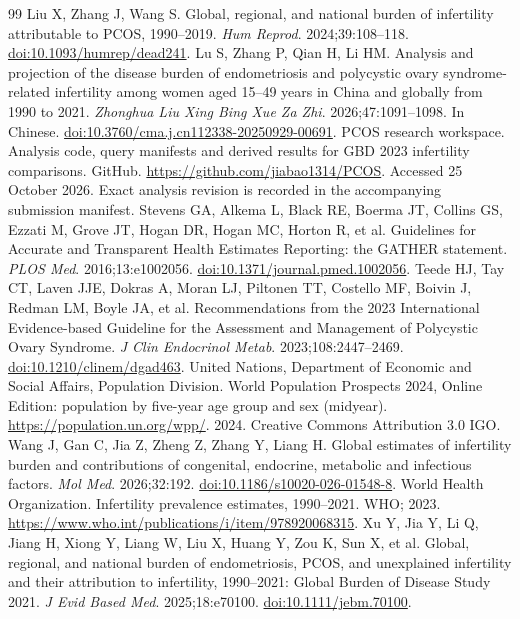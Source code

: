 \documentclass[11pt,a4paper]{article}
\begin{document}
{\begin{thebibliography}{99}
 Liu X, Zhang J, Wang S. Global, regional, and national burden of infertility attributable to PCOS, 1990--2019. \emph{Hum Reprod}. 2024;39:108--118. \href{https://doi.org/10.1093/humrep/dead241}{doi:10.1093/humrep/dead241}.
 Lu S, Zhang P, Qian H, Li HM. Analysis and projection of the disease burden of endometriosis and polycystic ovary syndrome-related infertility among women aged 15--49 years in China and globally from 1990 to 2021. \emph{Zhonghua Liu Xing Bing Xue Za Zhi}. 2026;47:1091--1098. In Chinese. \href{https://doi.org/10.3760/cma.j.cn112338-20250929-00691}{doi:10.3760/cma.j.cn112338-20250929-00691}.
 PCOS research workspace. Analysis code, query manifests and derived results for GBD 2023 infertility comparisons. GitHub. \url{https://github.com/jiabao1314/PCOS}. Accessed 25 October 2026. Exact analysis revision is recorded in the accompanying submission manifest.
Stevens GA, Alkema L, Black RE, Boerma JT, Collins GS, Ezzati M, Grove JT, Hogan DR, Hogan MC, Horton R, et al. Guidelines for Accurate and Transparent Health Estimates Reporting: the GATHER statement. \emph{PLOS Med}. 2016;13:e1002056. \href{https://doi.org/10.1371/journal.pmed.1002056}{doi:10.1371/journal.pmed.1002056}.
Teede HJ, Tay CT, Laven JJE, Dokras A, Moran LJ, Piltonen TT, Costello MF, Boivin J, Redman LM, Boyle JA, et al. Recommendations from the 2023 International Evidence-based Guideline for the Assessment and Management of Polycystic Ovary Syndrome. \emph{J Clin Endocrinol Metab}. 2023;108:2447--2469. \href{https://doi.org/10.1210/clinem/dgad463}{doi:10.1210/clinem/dgad463}.
 United Nations, Department of Economic and Social Affairs, Population Division. World Population Prospects 2024, Online Edition: population by five-year age group and sex (midyear). \url{https://population.un.org/wpp/}. 2024. Creative Commons Attribution 3.0 IGO.
Wang J, Gan C, Jia Z, Zheng Z, Zhang Y, Liang H. Global estimates of infertility burden and contributions of congenital, endocrine, metabolic and infectious factors. \emph{Mol Med}. 2026;32:192. \href{https://doi.org/10.1186/s10020-026-01548-8}{doi:10.1186/s10020-026-01548-8}.
 World Health Organization. Infertility prevalence estimates, 1990--2021. WHO; 2023. \url{https://www.who.int/publications/i/item/978920068315}.
Xu Y, Jia Y, Li Q, Jiang H, Xiong Y, Liang W, Liu X, Huang Y, Zou K, Sun X, et al. Global, regional, and national burden of endometriosis, PCOS, and unexplained infertility and their attribution to infertility, 1990--2021: Global Burden of Disease Study 2021. \emph{J Evid Based Med}. 2025;18:e70100. \href{https://doi.org/10.1111/jebm.70100}{doi:10.1111/jebm.70100}.
\end{thebibliography}
}
\end{document}
